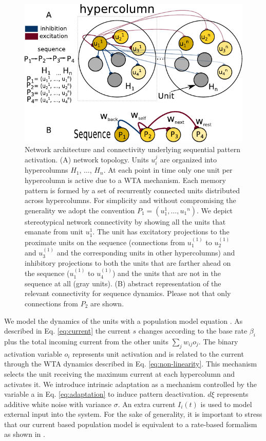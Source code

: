 \documentclass[10pt,a4paper]{article}
\begin{document}
\begin{figure}[H]
\centering
\includegraphics[scale=1.0]{paper_diagram.pdf}
\caption{Network architecture and connectivity underlying sequential pattern activation. (A) network topology. Units $u_i^j$ are organized into hypercolumns $H_1$, $\ldots$, $H_n$. At each point in time only one unit per hypercolumn is active due to a WTA mechanism. Each memory pattern is formed by a set of recurrently connected units distributed across hypercolumns. For simplicity and without compromising the generality we adopt the convention $P_1=(u_1^1, \ldots, u_1{^n})$. We depict stereotypical network connectivity by showing all the units that emanate from unit $u_1^{1}$. The unit has excitatory projections to the proximate units on the sequence (connections from $u_1^{(1)}$ to $u_2^{(1)}$ and $u_3^{(1)}$ and the corresponding units in other hypercolumns) and inhibitory projections to both the units that are farther ahead on the sequence ($u_1^{(1)}$ to $u_4^{(1)}$) and the units that are not in the sequence at all (gray units). (B) abstract representation of the relevant connectivity for  sequence dynamics. Please not that only connections from $P_2$ are shown.}
\label{fig:networks_scheme}
\end{figure}

We model the dynamics of the units with a population model equation \cite{wilson1972excitatory}. As described in Eq. \ref{eq:current} the current $s$ changes according to the base rate $\beta_i$ plus the total incoming current from the other units $ \sum_{j} w_{ij} o_j$. The binary activation variable $o_i$ represents unit activation and is related to the current through the WTA dynamics described in Eq. \ref{eq:non-linearity}. This  mechanism selects the unit receiving the maximum current at each hypercolumn and activates it. We introduce intrinsic adaptation as a mechanism controlled by the variable a in Eq. \ref{eq:adaptation} to induce pattern deactivation. $d\xi$ represents additive white noise with variance $\sigma$. An extra current $I_i(t)$ is used to model external input into the system. For the sake of generality, it is important to stress that our current based population model is equivalent to a rate-based formalism as shown in \cite{miller2012mathematical}. 
\end{document}
